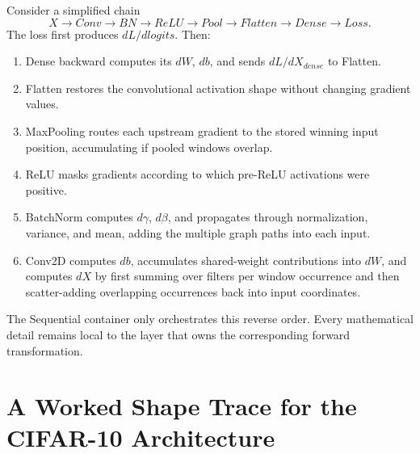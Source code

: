 \documentclass[11pt,a4paper]{article}
\begin{document}
Consider a simplified chain
\[
X
\rightarrow Conv
\rightarrow BN
\rightarrow ReLU
\rightarrow Pool
\rightarrow Flatten
\rightarrow Dense
\rightarrow Loss.
\]
The loss first produces $dL/dlogits$. Then:
\begin{enumerate}[leftmargin=2em]
    \item Dense backward computes its $dW$, $db$, and sends $dL/dX_{dense}$ to Flatten.
    \item Flatten restores the convolutional activation shape without changing gradient values.
    \item MaxPooling routes each upstream gradient to the stored winning input position, accumulating if pooled windows overlap.
    \item ReLU masks gradients according to which pre-ReLU activations were positive.
    \item BatchNorm computes $d\gamma$, $d\beta$, and propagates through normalization, variance, and mean, adding the multiple graph paths into each input.
    \item Conv2D computes $db$, accumulates shared-weight contributions into $dW$, and computes $dX$ by first summing over filters per window occurrence and then scatter-adding overlapping occurrences back into input coordinates.
\end{enumerate}

The Sequential container only orchestrates this reverse order. Every mathematical detail remains local to the layer that owns the corresponding forward transformation.

\section{A Worked Shape Trace for the CIFAR-10 Architecture}
\end{document}
